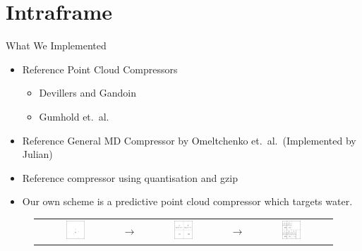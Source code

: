 \documentclass{beamer}
\begin{document}
\section{Intraframe}
\begin{frame}{What We Implemented}
  \begin{itemize}
    \item Reference Point Cloud Compressors
      \begin{itemize}
        \item Devillers and Gandoin
        \item Gumhold et.~al.
      \end{itemize}
    \item Reference General MD Compressor by Omeltchenko et.~al.~(Implemented
      by Julian)
    \item Reference compressor using quantisation and gzip
    \item Our own scheme is a predictive point cloud compressor which targets
      water.
  \end{itemize}
  \begin{figure}[h]
    \centering
    \begin{tabular}{ccccc}
        \includegraphics[width=0.25\textwidth]{keegan-images/dg1}
      & $\to$
      & \includegraphics[width=0.25\textwidth]{keegan-images/dg2}
      & $\to$
      & \includegraphics[width=0.25\textwidth]{keegan-images/dg3}
    \end{tabular}
  \end{figure}
\end{frame}
\end{document}
